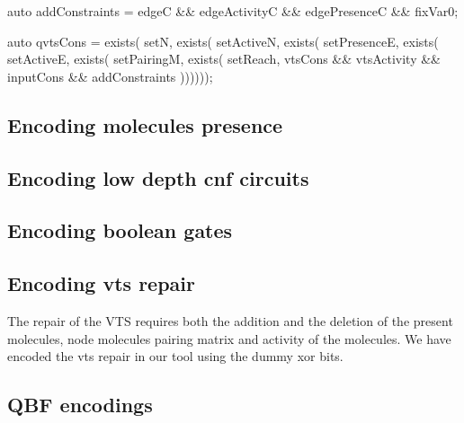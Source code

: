 
    
    auto addConstraints = edgeC \&\& edgeActivityC \&\& edgePresenceC  \&\& fixVar0;

    auto qvtsCons = exists( setN, 
                    exists( setActiveN, 
                    exists( setPresenceE,  
                    exists( setActiveE, 
                    exists( setPairingM, 
                    exists( setReach, 
                            vtsCons \&\& vtsActivity \&\& inputCons \&\& addConstraints ))))));   

 
\subsection{Encoding molecules presence}

\subsection{Encoding low depth cnf circuits}

\subsection{Encoding boolean gates}

\subsection{Encoding vts repair}
The repair of the VTS requires both the addition and the deletion of the present molecules, node molecules pairing matrix and activity of the molecules. We have encoded the vts repair in our tool using the dummy xor bits.


\subsection{QBF encodings}





